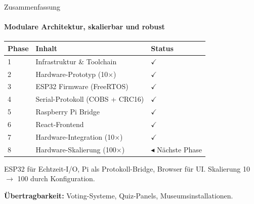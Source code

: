 \begin{frame}{Zusammenfassung}
\framesubtitle{Modulare Architektur, skalierbar und robust}

\begin{table}
\centering
\small
\begin{tabular}{@{}lll@{}}
\toprule
\textbf{Phase} & \textbf{Inhalt} & \textbf{Status} \\
\midrule
1 & Infrastruktur \& Toolchain & \textcolor{SuccessGreen}{$\checkmark$} \\
2 & Hardware-Prototyp (10$\times$) & \textcolor{SuccessGreen}{$\checkmark$} \\
3 & ESP32 Firmware (FreeRTOS) & \textcolor{SuccessGreen}{$\checkmark$} \\
4 & Serial-Protokoll (COBS + CRC16) & \textcolor{SuccessGreen}{$\checkmark$} \\
5 & Raspberry Pi Bridge & \textcolor{SuccessGreen}{$\checkmark$} \\
6 & React-Frontend & \textcolor{SuccessGreen}{$\checkmark$} \\
7 & Hardware-Integration (10$\times$) & \textcolor{SuccessGreen}{$\checkmark$} \\
8 & Hardware-Skalierung (100$\times$) & \textcolor{RaspberryRed}{$\blacktriangleleft$} N\"{a}chste Phase \\
\bottomrule
\end{tabular}
\end{table}

\vspace{0.3cm}
 ESP32 f\"{u}r Echtzeit-I/O, Pi als Protokoll-Bridge, Browser f\"{u}r UI. Skalierung 10 $\rightarrow$ 100 durch Konfiguration.

\vspace{0.2cm}
\textbf{\"{U}bertragbarkeit:} Voting-Systeme, Quiz-Panels, Museumsinstallationen.
\end{frame}

